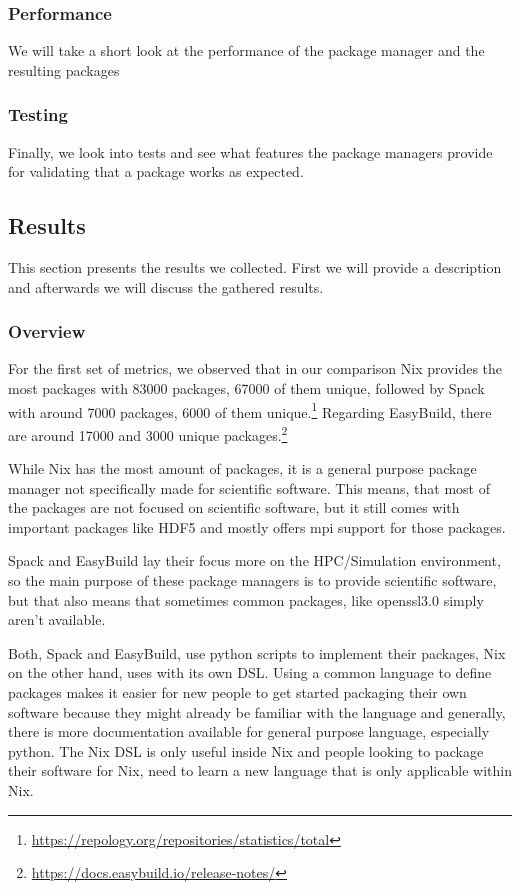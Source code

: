 \documentclass[conference,final,a4paper]{IEEEtran}
\begin{document}
\subsubsection{Performance}
We will take a short look at the performance of the package manager and the resulting packages\\

\subsubsection{Testing}
Finally, we look into tests and see what features the package managers provide for validating that a package works as expected.

\subsection{Results}

This section presents the results we collected.
First we will provide a description and afterwards we will discuss the gathered results.\\

\subsubsection{Overview}

For the first set of metrics, we observed that in our comparison Nix provides the most packages with 83000 packages, 67000 of them unique, followed by Spack with around 7000 packages, 6000 of them unique.\footnote{\url{https://repology.org/repositories/statistics/total}}
Regarding EasyBuild, there are around 17000 and 3000 unique packages.\footnote{\url{https://docs.easybuild.io/release-notes/}}

While Nix has the most amount of packages, it is a general purpose package manager not specifically made for scientific software.
This means, that most of the packages are not focused on scientific software, but it still comes with important packages like HDF5 and mostly offers mpi support for those packages.

Spack and EasyBuild lay their focus more on the HPC/Simulation environment, so the main purpose of these package managers is to provide scientific software, but that also means that sometimes common packages, like openssl3.0 simply aren't available.

Both, Spack and EasyBuild, use python scripts to implement their packages, Nix on the other hand, uses with its own DSL.
Using a common language to define packages makes it easier for new people to get started packaging their own software because they might already be familiar with the language and generally, there is more documentation available for general purpose language, especially python.
The Nix DSL is only useful inside Nix and people looking to package their software for Nix, need to learn a new language that is only applicable within Nix.\\
\end{document}
